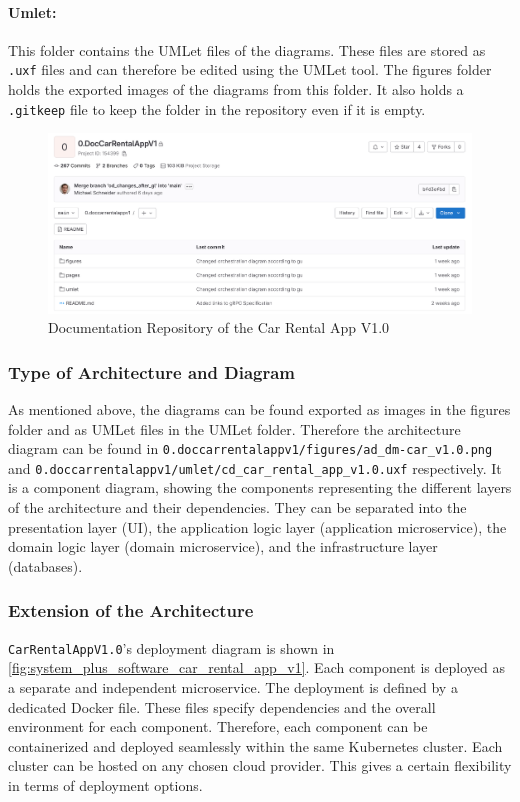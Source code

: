 \paragraph*{Umlet:}
This folder contains the UMLet files of the diagrams.
These files are stored as \texttt{.uxf} files and can therefore be edited using the UMLet tool.
The figures folder holds the exported images of the diagrams from this folder.
It also holds a \texttt{.gitkeep} file to keep the folder in the repository even if it is empty.

\begin{figure}
    \centering
    \includegraphics[width=\textwidth]{figures/microservices/introduction/ms_intro_docRepo.png}
    \caption{Documentation Repository of the Car Rental App V1.0}
    \label{fig:doc_repo_car_rental_app_v1}
\end{figure}

\subsubsection*{Type of Architecture and Diagram}
As mentioned above, the diagrams can be found exported as images in the figures folder and as UMLet files in the UMLet folder.
Therefore the architecture diagram can be found in \texttt{0.doccarrentalappv1/figures/ad\_dm-car\_v1.0.png} and \hfill \linebreak \texttt{0.doccarrentalappv1/umlet/cd\_car\_rental\_app\_v1.0.uxf} respectively.
It is a component diagram, showing the components representing the different layers of the architecture and their dependencies.
They can be separated into the presentation layer (UI), the application logic layer (application microservice), the domain logic layer (domain microservice), and the infrastructure layer (databases).

\subsubsection*{Extension of the Architecture}
\texttt{CarRentalAppV1.0}'s deployment diagram is shown in \autoref{fig:system_plus_software_car_rental_app_v1}.
Each component is deployed as a separate and independent microservice.
The deployment is defined by a dedicated Docker file.
These files specify dependencies and the overall environment for each component.
Therefore, each component can be containerized and deployed seamlessly within the same Kubernetes cluster.
Each cluster can be hosted on any chosen cloud provider.
This gives a certain flexibility in terms of deployment options.

